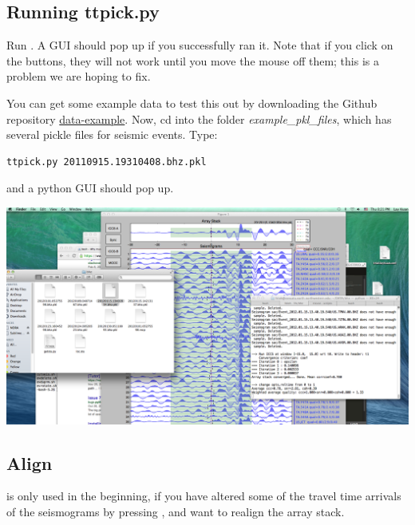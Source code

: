 \documentclass[letterpaper,10pt,english]{sphinxmanual}
\begin{document}
\subsection{Running ttpick.py}
\label{docfiles/PickingTravelTimes:running-ttpick-py}
Run . A GUI should pop up if you successfully ran it. Note that if you click on the buttons, they will not work until you move the mouse off them; this is a problem we are hoping to fix.

You can get some example data to test this out by downloading the Github repository \href{https://github.com/pysmo/data-example}{data-example}. Now, cd into the folder \emph{example\_pkl\_files}, which has several pickle files for seismic events. Type:

\begin{Verbatim}[commandchars=\\\{\}]
ttpick.py 20110915.19310408.bhz.pkl
\end{Verbatim}

and a python GUI should pop up.

\includegraphics{pick_travel_times.png}


\subsection{Align}
\label{docfiles/PickingTravelTimes:align}
 is only used in the beginning, if you have altered some of the travel time arrivals of the seismograms by pressing , and want to realign the array stack.
\end{document}
